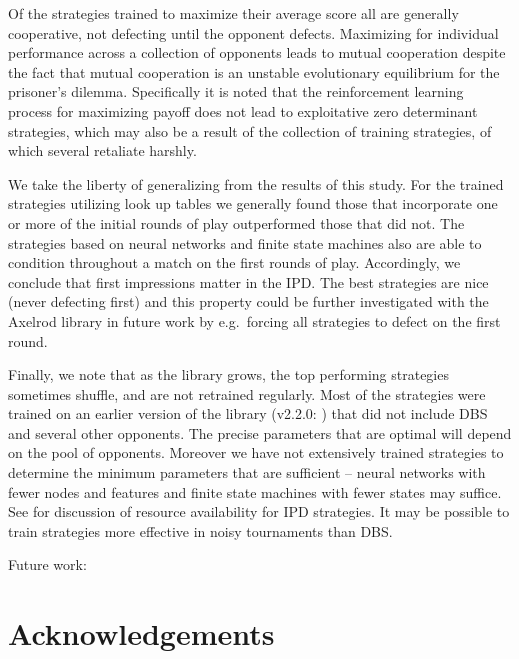 \documentclass{article}
\begin{document}
Of the strategies trained to maximize their average score all are generally
cooperative, not defecting until the opponent defects. Maximizing for individual
performance across a collection of opponents leads to mutual cooperation despite
the fact that mutual cooperation is an unstable evolutionary equilibrium for the prisoner's
dilemma. Specifically it is noted that the reinforcement learning process for maximizing
payoff does not lead to exploitative zero determinant strategies, which may also
be a result of the collection of training strategies, of which several retaliate harshly.

We take the liberty of generalizing from the results of this study. For the trained
strategies utilizing look up tables we generally found those that incorporate
one or more of the initial rounds of play outperformed those that did not. The
strategies based on neural networks and finite state machines also are able to
condition throughout a match on the first rounds of play. Accordingly, we conclude
that first impressions matter in the IPD\@. The best strategies are nice (never
defecting first) and this property could be further investigated with the
Axelrod library
in future work by e.g.\ forcing all strategies to defect on the first round.

Finally, we note that as the library grows, the top performing strategies
sometimes shuffle, and are not retrained regularly. Most of the strategies were
trained on an earlier version of the library (v2.2.0: \cite{axelrodproject2.2})
that did not include DBS and several other opponents. The precise parameters
that are optimal will depend on the pool of opponents. Moreover we have not
extensively trained strategies to determine the minimum parameters that are
sufficient -- neural networks with fewer nodes and features and finite state
machines with fewer states may suffice. See \cite{ashlock2013impact} for
discussion of resource availability for IPD strategies. It may be possible to
train strategies more effective in noisy tournaments than DBS.

Future work:


\section*{Acknowledgements}
\end{document}
